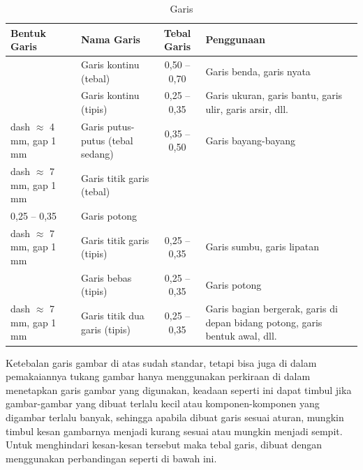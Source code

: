\documentclass[../menggambarteknik.tex]{subfiles}
\begin{document}
\begin{table}[htb]
	\caption{Garis}
	\label{tb:nome}
	\begin{tabularx}{\textwidth}{p{2.5cm} X c X}
		\hline
		\textbf{Bentuk Garis}          &  \textbf{Nama Garis}               &  \textbf{Tebal Garis}  &  \textbf{Penggunaan}  \\
		\hline
		                               &  Garis kontinu (tebal)             &  0,50 -- 0,70          &  Garis benda, garis nyata  \\
		\hline
		                               &  Garis kontinu (tipis)             &  0,25 -- 0,35          &  Garis ukuran, garis bantu, garis ulir, garis arsir, dll.  \\
		\hline
		dash $\approx$ 4 mm, gap 1 mm  &  Garis putus-putus (tebal sedang)  &  0,35 -- 0,50          &  Garis bayang-bayang  \\
		\hline
		dash $\approx$ 7 mm, gap 1 mm  &  Garis titik garis (tebal)         &
		\begin{tabular}[c]{@{}c@{}}0,50 -- 0,70\\0,25 -- 0,35\end{tabular}
		                               &  Garis potong  \\
		\hline
		dash $\approx$ 7 mm, gap 1 mm  &  Garis titik garis (tipis)         &  0,25 -- 0,35          &  Garis sumbu, garis lipatan  \\
		\hline
		                               &  Garis bebas (tipis)               &  0,25 -- 0,35          &  Garis potong  \\
		\hline

		dash $\approx$ 7 mm, gap 1 mm  &  Garis titik dua garis (tipis)     &  0,25 -- 0,35          &  Garis bagian bergerak, garis di depan bidang potong, garis bentuk awal, dll.  \\
		\hline
	\end{tabularx}
\end{table}

Ketebalan garis gambar di atas sudah standar, tetapi bisa juga di dalam pemakaiannya tukang gambar hanya menggunakan perkiraan di dalam menetapkan garis gambar yang digunakan, keadaan seperti ini dapat timbul jika gambar-gambar  yang  dibuat  terlalu  kecil  atau  komponen-komponen  yang digambar terlalu banyak, sehingga apabila dibuat garis sesuai aturan, mungkin timbul kesan gambarnya menjadi kurang sesuai atau mungkin menjadi sempit. Untuk menghindari kesan-kesan tersebut maka tebal garis, dibuat dengan menggunakan perbandingan seperti di bawah ini.
\end{document}
